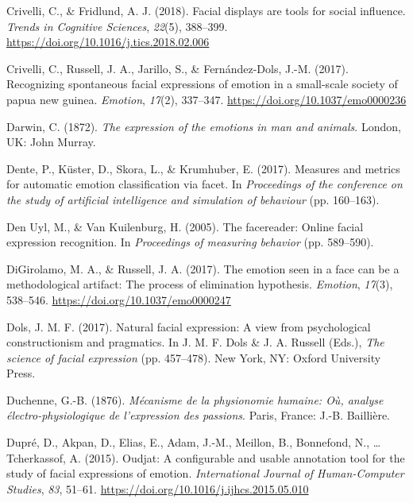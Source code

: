 \documentclass[
  english,
  doc]{apa7}
\newlength{\cslhangindent}
\newenvironment{cslreferences}%
  {\setlength{\parindent}{0pt}%
  \everypar{\setlength{\hangindent}{\cslhangindent}}\ignorespaces}%
  {\par}
\begin{document}
\begin{cslreferences}
\leavevmode\hypertarget{ref-crivelli2018facial}{}%
Crivelli, C., \& Fridlund, A. J. (2018). Facial displays are tools for social influence. \emph{Trends in Cognitive Sciences}, \emph{22}(5), 388--399. \url{https://doi.org/10.1016/j.tics.2018.02.006}

\leavevmode\hypertarget{ref-crivelli2017recognizing}{}%
Crivelli, C., Russell, J. A., Jarillo, S., \& Fernández-Dols, J.-M. (2017). Recognizing spontaneous facial expressions of emotion in a small-scale society of papua new guinea. \emph{Emotion}, \emph{17}(2), 337--347. \url{https://doi.org/10.1037/emo0000236}

\leavevmode\hypertarget{ref-darwin1872expression}{}%
Darwin, C. (1872). \emph{The expression of the emotions in man and animals}. London, UK: John Murray.

\leavevmode\hypertarget{ref-dente2017measures}{}%
Dente, P., Küster, D., Skora, L., \& Krumhuber, E. (2017). Measures and metrics for automatic emotion classification via facet. In \emph{Proceedings of the conference on the study of artificial intelligence and simulation of behaviour} (pp. 160--163).

\leavevmode\hypertarget{ref-den2005facereader}{}%
Den Uyl, M., \& Van Kuilenburg, H. (2005). The facereader: Online facial expression recognition. In \emph{Proceedings of measuring behavior} (pp. 589--590).

\leavevmode\hypertarget{ref-digirolamo2017emotion}{}%
DiGirolamo, M. A., \& Russell, J. A. (2017). The emotion seen in a face can be a methodological artifact: The process of elimination hypothesis. \emph{Emotion}, \emph{17}(3), 538--546. \url{https://doi.org/10.1037/emo0000247}

\leavevmode\hypertarget{ref-dols2017natural}{}%
Dols, J. M. F. (2017). Natural facial expression: A view from psychological constructionism and pragmatics. In J. M. F. Dols \& J. A. Russell (Eds.), \emph{The science of facial expression} (pp. 457--478). New York, NY: Oxford University Press.

\leavevmode\hypertarget{ref-duchenne1876mecanisme}{}%
Duchenne, G.-B. (1876). \emph{Mécanisme de la physionomie humaine: Où, analyse électro-physiologique de l'expression des passions}. Paris, France: J.-B. Baillière.

\leavevmode\hypertarget{ref-dupre2015oudjat}{}%
Dupré, D., Akpan, D., Elias, E., Adam, J.-M., Meillon, B., Bonnefond, N., \ldots{} Tcherkassof, A. (2015). Oudjat: A configurable and usable annotation tool for the study of facial expressions of emotion. \emph{International Journal of Human-Computer Studies}, \emph{83}, 51--61. \url{https://doi.org/10.1016/j.ijhcs.2015.05.010}


\end{cslreferences}
\end{document}

